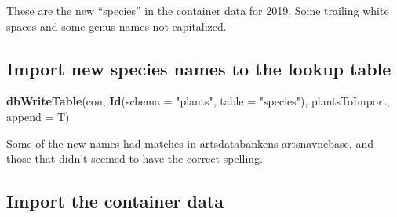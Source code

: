 \documentclass[]{article}
\newenvironment{Shaded}{\begin{snugshade}}{\end{snugshade}}
\newcommand{\DataTypeTok}[1]{\textcolor[rgb]{0.13,0.29,0.53}{#1}}
\newcommand{\KeywordTok}[1]{\textcolor[rgb]{0.13,0.29,0.53}{\textbf{#1}}}
\newcommand{\NormalTok}[1]{#1}
\newcommand{\OperatorTok}[1]{\textcolor[rgb]{0.81,0.36,0.00}{\textbf{#1}}}
\newcommand{\OtherTok}[1]{\textcolor[rgb]{0.56,0.35,0.01}{#1}}
\newcommand{\StringTok}[1]{\textcolor[rgb]{0.31,0.60,0.02}{#1}}
\begin{document}
These are the new ``species'' in the container data for 2019. Some
trailing white spaces and some genus names not capitalized.

\begin{Shaded}
\end{Shaded}

\hypertarget{import-new-species-names-to-the-lookup-table}{%
\subsection{Import new species names to the lookup
table}\label{import-new-species-names-to-the-lookup-table}}

\begin{Shaded}
\end{Shaded}

\begin{Shaded}
\begin{Highlighting}[]
\KeywordTok{dbWriteTable}\NormalTok{(con, }\KeywordTok{Id}\NormalTok{(}\DataTypeTok{schema =} \StringTok{"plants"}\NormalTok{, }\DataTypeTok{table =} \StringTok{"species"}\NormalTok{),}
\NormalTok{             plantsToImport,}
             \DataTypeTok{append =}\NormalTok{ T)}
\end{Highlighting}
\end{Shaded}

Some of the new names had matches in artsdatabankens artsnavnebase, and
those that didn't seemed to have the correct spelling.

\hypertarget{import-the-container-data}{%
\subsection{Import the container data}\label{import-the-container-data}}
\end{document}
